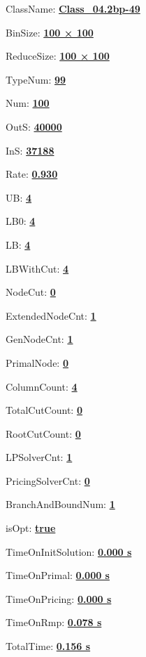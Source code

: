 \documentclass[11pt]{article}
\begin{document}
\pagestyle{empty}


ClassName: \underline{\textbf{Class_04.2bp-49}}
\par
BinSize: \underline{\textbf{100 × 100}}
\par
ReduceSize: \underline{\textbf{100 × 100}}
\par
TypeNum: \underline{\textbf{99}}
\par
Num: \underline{\textbf{100}}
\par
OutS: \underline{\textbf{40000}}
\par
InS: \underline{\textbf{37188}}
\par
Rate: \underline{\textbf{0.930}}
\par
UB: \underline{\textbf{4}}
\par
LB0: \underline{\textbf{4}}
\par
LB: \underline{\textbf{4}}
\par
LBWithCut: \underline{\textbf{4}}
\par
NodeCut: \underline{\textbf{0}}
\par
ExtendedNodeCnt: \underline{\textbf{1}}
\par
GenNodeCnt: \underline{\textbf{1}}
\par
PrimalNode: \underline{\textbf{0}}
\par
ColumnCount: \underline{\textbf{4}}
\par
TotalCutCount: \underline{\textbf{0}}
\par
RootCutCount: \underline{\textbf{0}}
\par
LPSolverCnt: \underline{\textbf{1}}
\par
PricingSolverCnt: \underline{\textbf{0}}
\par
BranchAndBoundNum: \underline{\textbf{1}}
\par
isOpt: \underline{\textbf{true}}
\par
TimeOnInitSolution: \underline{\textbf{0.000 s}}
\par
TimeOnPrimal: \underline{\textbf{0.000 s}}
\par
TimeOnPricing: \underline{\textbf{0.000 s}}
\par
TimeOnRmp: \underline{\textbf{0.078 s}}
\par
TotalTime: \underline{\textbf{0.156 s}}
\par
\newpage
\end{document}
